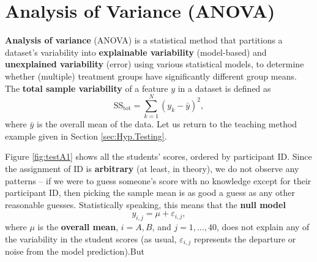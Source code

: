 \section{Analysis of Variance (ANOVA)}\label{sec:ANOVA}
\textbf{Analysis of variance} (ANOVA) is a statistical method that partitions a dataset's variability into \textbf{explainable variability} (model-based) and \textbf{unexplained variability} (error) using various statistical models, to determine whether (multiple) treatment groups have significantly different group means. 
\newl The \textbf{total sample variability} of a feature $y$ in a dataset is defined as
$$
    \text{SS}_{\textrm{tot}}=\sum_{k=1}^{N}(y_{k}-\bar{y})^{2},
$$
where $\bar{y}$ is the overall mean of the data. 
\newl Let us return to the teaching method example given in Section \ref{sec:Hyp.Testing}. \par Figure \ref{fig:testA1} shows all the students' scores, ordered by participant ID. Since the assignment of ID is \textbf{arbitrary} (at least, in theory), we do not observe any patterns -- if we were to guess someone's score with no knowledge except for their participant ID, then picking the sample mean is as good a guess as any other reasonable guesses. \newl Statistically speaking, this means that the \textbf{null model}
$$
    y_{i,j}=\mu+\varepsilon_{i,j},
$$
where $\mu$ is the \textbf{overall mean}, $i= {A,B}$, and $j=1,\ldots,40$, does not explain any of the variability in the student scores (as usual, $\varepsilon_{i,j}$ represents the departure or noise from the model prediction).\newl But 

